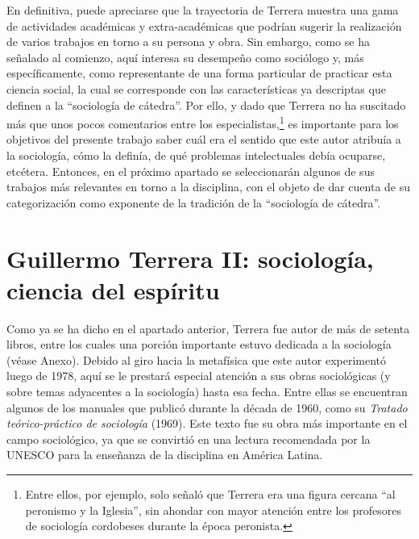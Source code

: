 En definitiva, puede apreciarse que la trayectoria de Terrera muestra una gama de actividades académicas y extra-académicas que podrían sugerir la realización de varios trabajos en torno a su persona y obra. Sin embargo, como se ha señalado al comienzo, aquí interesa su desempeño como sociólogo y, más específicamente, como representante de una forma particular de practicar esta ciencia social, la cual se corresponde con las características ya descriptas que definen a la ``sociología de cátedra''. Por ello, y dado que Terrera no ha suscitado más que unos pocos comentarios entre los especialistas,\footnote{Entre ellos, por ejemplo, \textcite[22]{1447-CARACCIOLO2010} solo señaló que Terrera era una figura cercana ``al peronismo y la Iglesia'', sin ahondar con mayor atención entre los profesores de sociología cordobeses durante la época peronista.} es importante para los objetivos del presente trabajo saber cuál era el sentido que este autor atribuía a la sociología, cómo la definía, de qué problemas intelectuales debía ocuparse, etcétera. Entonces, en el próximo apartado se seleccionarán algunos de sus trabajos más relevantes en torno a la disciplina, con el objeto de dar cuenta de su categorización como exponente de la tradición de la ``sociología de cátedra''.

\section{Guillermo Terrera II: sociología, ciencia del espíritu}

Como ya se ha dicho en el apartado anterior, Terrera fue autor de más de setenta libros, entre los cuales una porción importante estuvo dedicada a la sociología (véase Anexo). Debido al giro hacia la metafísica que este autor experimentó luego de 1978, aquí se le prestará especial atención a sus obras sociológicas (y sobre temas adyacentes a la sociología) hasta esa fecha. Entre ellas se encuentran algunos de los manuales que publicó durante la década de 1960, como su \emph{Tratado teórico-práctico de sociología} (1969). Este texto fue su obra más importante en el campo sociológico, ya que se convirtió en una lectura recomendada por la UNESCO para la enseñanza de la disciplina en América Latina.


